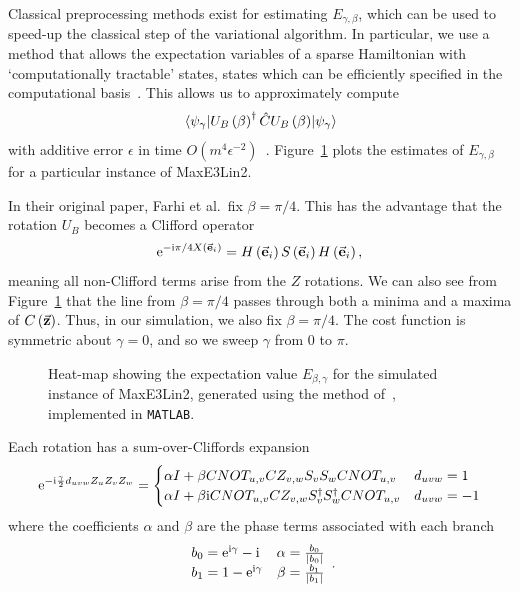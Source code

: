 Classical preprocessing methods exist for estimating $E_{\gamma,\beta}$, which can be used to speed-up the classical step of the variational algorithm. In particular, we use a method that allows the expectation variables of a sparse Hamiltonian with `computationally tractable' states, states which can be efficiently specified in the computational basis~\cite{VandenNest2009}. This allows us to approximately compute
\[\matrixel{\psi_{\gamma}}{U_{B}\left(\beta\right)^{\dagger} \hat{C}U_{B}\left(\beta\right)}{\psi_{\gamma}}\]
with additive error $\epsilon$ in time $O(m^{4}\epsilon^{-2})$~\cite{Bravyi2018}. Figure~\ref{fig:mc_qaoa} plots the estimates of $E_{\gamma,\beta}$ for a particular instance of MaxE3Lin2.\par
In their original paper, Farhi et al.\ fix $\beta=\pi/4$. This has the advantage that the rotation $U_{B}$ becomes a Clifford operator 
\[\mathrm{e}^{-\mathrm{i} \pi/4 X\left(\va{e}_{i}\right)}=H\left(\va{e}_{i}\right)S\left(\va{e}_{i}\right)H\left(\va{e}_{i}\right),\]
meaning all non-Clifford terms arise from the $Z$ rotations. We can also see from Figure~\ref{fig:mc_qaoa} that the line from $\beta=\pi/4$ passes through both a minima and a maxima of $C\left(\va{z}\right)$. Thus, in our simulation, we also fix $\beta=\pi/4$. The cost function is symmetric about $\gamma=0$, and so we sweep $\gamma$ from $0$ to $\pi$.
\begin{figure}[b]
\centering
\begin{scaletikzpicturetowidth}{0.7\textwidth}

\end{scaletikzpicturetowidth}
\caption{Heat-map showing the expectation value $E_{\beta,\gamma}$ for the simulated instance of MaxE3Lin2, generated using the method of~\cite{VandenNest2009}, implemented in \texttt{MATLAB}.}\label{fig:mc_qaoa}
\end{figure}
Each rotation has a sum-over-Cliffords expansion~\cite{Bravyi2018}
\[\mathrm{e}^{-\mathrm{i} \frac{\gamma}{2} d_{uvw}Z_{u}Z_{v}Z_{w}} = \begin{cases}
\alpha I + \beta CNOT_{u,v}CZ_{v,w}S_{v}S_{w}CNOT_{u,v} & d_{uvw} = 1\\
\alpha I + \beta \mathrm{i} CNOT_{u,v}CZ_{v,w}S^{\dagger}_{v}S^{\dagger}_{w}CNOT_{u,v} & d_{uvw} = -1\\
\end{cases}\]
where the coefficients $\alpha$ and $\beta$ are the phase terms associated with each branch
\[\begin{array}{lr}
b_{0} = \mathrm{e}^{\mathrm{i} \gamma}-\mathrm{i} & \alpha = \frac{b_{0}}{\left|b_{0}\right|}\\
b_{1} = 1 - \mathrm{e}^{\mathrm{i} \gamma} & \beta = \frac{b_{1}}{\left|b_{1}\right|}\\
\end{array}.\]
